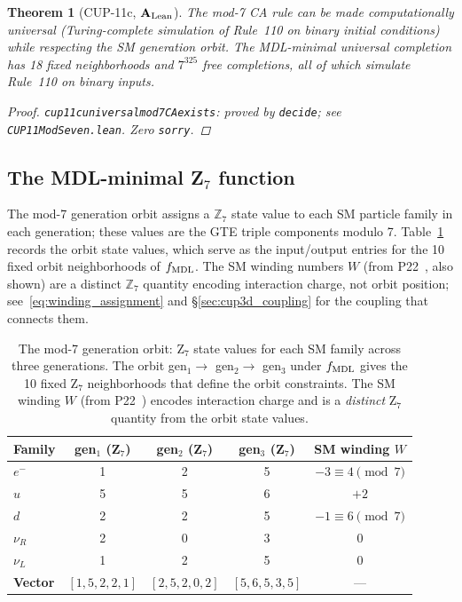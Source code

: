 \documentclass[11pt]{article}
\newtheorem{theorem}{Theorem}[section]
\theoremstyle{remark}
\newcommand{\lean}[1]{%
  \penalty-100
  \begingroup\def\_{\textunderscore\allowbreak}\texttt{#1}\endgroup}
\newcommand{\CatAL}{\ensuremath{\textbf{A}_{\rm Lean}}}
\begin{document}
\begin{theorem}[CUP-11c, $\CatAL$]
\label{thm:cup11c}
The mod-7 CA rule can be made computationally universal (Turing-complete simulation of
Rule~110 on binary initial conditions) while respecting the SM generation orbit.
The MDL-minimal universal completion has 18 fixed neighborhoods and $7^{325}$ free
completions, all of which simulate Rule~110 on binary inputs.
\begin{proof}
\lean{cup11c\_universal\_mod7\_CA\_exists}: proved by \lean{decide};
see \lean{CUP11ModSeven.lean}. Zero \texttt{sorry}.
\end{proof}
\end{theorem}

\subsection{The MDL-minimal Z$_7$ function}

The mod-7 generation orbit assigns a $\mathbb{Z}_7$ state value to each SM particle
family in each generation; these values are the GTE triple components modulo 7.
Table~\ref{tab:z7_orbit} records the orbit state values, which serve as the
input/output entries for the 10 fixed orbit neighborhoods of $f_{\rm MDL}$.
The SM winding numbers $W$ (from P22~\cite{Spivack2026_UGPDynamics}, also shown)
are a distinct $\mathbb{Z}_7$ quantity encoding interaction charge, not orbit position;
see~\eqref{eq:winding_assignment} and \S\ref{sec:cup3d_coupling} for the coupling
that connects them.

\begin{table}[H]
\centering
\caption{The mod-7 generation orbit: Z$_7$ state values for each SM family across
three generations. The orbit gen$_1 \to$ gen$_2 \to$ gen$_3$ under $f_{\rm MDL}$
gives the 10 fixed Z$_7$ neighborhoods that define the orbit constraints.
The SM winding $W$ (from P22~\protect\cite{Spivack2026_UGPDynamics}) encodes
interaction charge and is a \emph{distinct} Z$_7$ quantity from the orbit state values.}
\label{tab:z7_orbit}
\small
\renewcommand{\arraystretch}{1.2}
\begin{tabular}{@{}lcccc@{}}
\toprule
\textbf{Family} & \textbf{gen$_1$ (Z$_7$)} & \textbf{gen$_2$ (Z$_7$)} & \textbf{gen$_3$ (Z$_7$)} & \textbf{SM winding $W$}\\
\midrule
$e^-$ & 1 & 2 & 5 & $-3 \equiv 4 \pmod 7$\\
$u$   & 5 & 5 & 6 & $+2$\\
$d$   & 2 & 2 & 5 & $-1 \equiv 6 \pmod 7$\\
$\nu_R$ & 2 & 0 & 3 & $0$\\
$\nu_L$ & 1 & 2 & 5 & $0$\\
\midrule
\textbf{Vector} & $[1,5,2,2,1]$ & $[2,5,2,0,2]$ & $[5,6,5,3,5]$ & ---\\
\bottomrule
\end{tabular}
\end{table}
\end{document}
